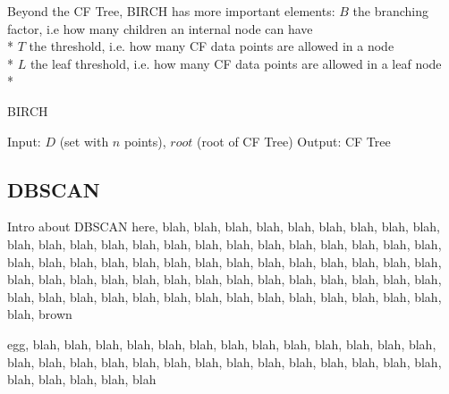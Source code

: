 \documentclass[conference, 10pt]{IEEEtran}
\begin{document}
Beyond the CF Tree, BIRCH has more important elements:\vspace{1 mm}
$B$ the branching factor, i.e how many children an internal node can have\\*
$T$ the threshold, i.e. how many CF data points are allowed in a node\\*
$L$ the leaf threshold, i.e. how many CF data points are allowed in a leaf node\\*

\begin{algorithm}
\caption{BIRCH}
\begin{algorithmic}[1]
    \State Input: $D$ (set with $n$ points), $root$ (root of CF Tree)
    \State Output: CF Tree
        \Else
      \EndIf
    \EndFor
  \EndProcedure
\end{algorithmic}
\end{algorithm}

\subsection{DBSCAN}
Intro about DBSCAN here, blah, blah, blah, blah, blah, blah, blah, blah, blah, blah, blah, blah, blah, blah, blah, blah, blah, blah, blah, blah, blah, blah, blah, blah, blah, blah, blah, blah, blah, blah, blah, blah, blah, blah, blah, blah, blah, blah, blah, blah, blah, blah, blah, blah, blah, blah, blah, blah, blah, blah, blah, blah, blah, blah, blah, blah, blah, blah, blah, blah, blah, blah, blah, blah, blah, blah, brown 
egg, blah, blah, blah, blah, blah, blah, blah, blah, blah, blah, blah, blah, blah, blah, blah, blah, blah, blah, blah, blah, blah, blah, blah, blah, blah, blah, blah, blah, blah, blah, blah, blah
\end{document}
